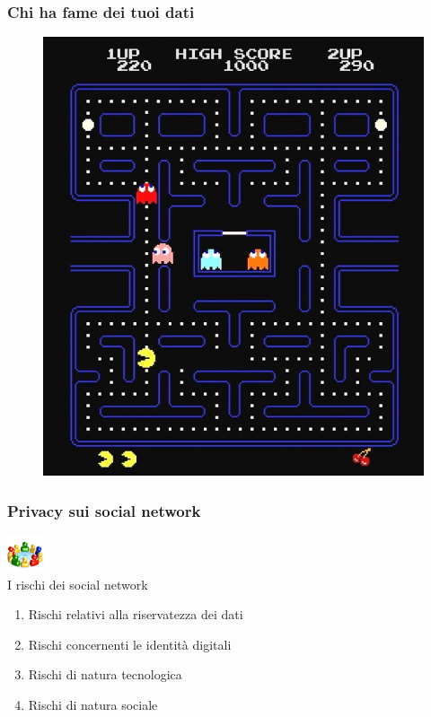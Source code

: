 \documentclass[xcolor=svgnames]{beamer}
\begin{document}
\begin{frame}
	\frametitle{Chi ha fame dei tuoi dati}

	\begin{figure}[+ht]
			\begin{center}
					\includegraphics{img/pacman.jpg}
			\end{center}
	\end{figure}
\end{frame}

\begin{frame}
	\frametitle{Privacy sui social network}

	\begin{block}{\includegraphics[width=40px]{img/social.png} \\ I rischi dei social network}
			\begin{enumerate}
						\pause
					\item Rischi relativi alla riservatezza dei dati
						\pause
					\item Rischi concernenti le identità digitali
						\pause
					\item Rischi di natura tecnologica
						\pause
					\item Rischi di natura sociale
			\end{enumerate}
	\end{block}
\end{frame}
\end{document}

